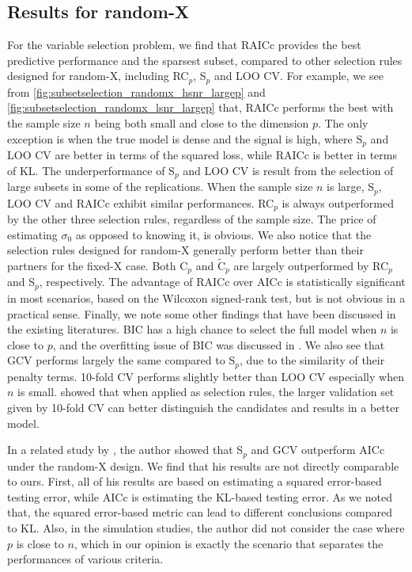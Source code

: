 \subsection{Results for random-X}
For the variable selection problem, we find that RAICc provides the best predictive performance and the sparsest subset, compared to other selection rules designed for random-X, including RC$_p$, S$_p$ and LOO CV. For example, we see from \ref{fig:subsetselection_randomx_hsnr_largep} and \ref{fig:subsetselection_randomx_lsnr_largep} that, RAICc performs the best with the sample size $n$ being both small and close to the dimension $p$. The only exception is when the true model is dense and the signal is high, where S$_p$ and LOO CV are better in terms of the squared loss, while RAICc is better in terms of KL. The underperformance of S$_p$ and LOO CV is result from the selection of large subsets in some of the replications. When the sample size $n$ is large, S$_p$, LOO CV and RAICc exhibit similar performances. RC$_p$ is always outperformed by the other three selection rules, regardless of the sample size. The price of estimating $\sigma_0$ as opposed to knowing it, is obvious. We also notice that the selection rules designed for random-X generally perform better than their partners for the fixed-X case. Both C$_p$ and $\tilde{\text{C}}_p$ are largely outperformed by RC$_p$ and S$_p$, respectively. The advantage of RAICc over AICc is statistically significant in most scenarios, based on the Wilcoxon signed-rank test, but is not obvious in a practical sense. Finally, we note some other findings that have been discussed in the existing literatures. BIC has a high chance to select the full model when $n$ is close to $p$, and the overfitting issue of BIC was discussed in \citet{baraud2009gaussian}. We also see that GCV performs largely the same compared to S$_p$, due to the similarity of their penalty terms. 10-fold CV performs slightly better than LOO CV especially when $n$ is small. \citet{zhang2015cross} showed that when applied as selection rules, the larger validation set given by 10-fold CV can better distinguish the candidates and results in a better model. 

In a related study by \citet{leeb2008evaluation}, the author showed that S$_p$ and GCV outperform AICc under the random-X design. We find that his results are not directly comparable to ours. First, all of his results are based on estimating a squared error-based testing error, while AICc is estimating the KL-based testing error. As we noted that, the squared error-based metric can lead to different conclusions compared to KL. Also, in the simulation studies, the author did not consider the case where $p$ is close to $n$, which in our opinion is exactly the scenario that separates the performances of various criteria. 


